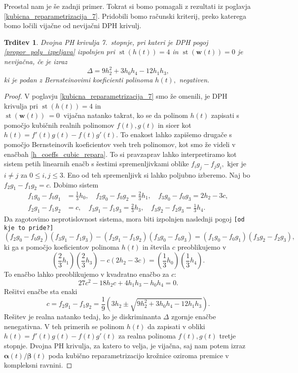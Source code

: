 \documentclass[12pt,a4paper,twoside]{article}
\theoremstyle{definition} %
\theoremstyle{plain} %
\newtheorem{trditev}[definicija]{Trditev}
\numberwithin{equation}{section}  %
\newcommand{\wV}{\mathbf{w}}
\newcommand{\balpha}{\boldsymbol \alpha}
\newcommand{\bbeta}{\boldsymbol \beta}
\DeclareMathOperator{\st}{st}
\begin{document}
Preostal nam je še zadnji primer. Tokrat si bomo pomagali z rezultati iz poglavja \ref{kubicna_reparametrizacija_7}. Pridobili bomo računski kriterij, preko katerega bomo ločili vijačne od nevijačni DPH krivulj.
\begin{trditev}
	Dvojna PH krivulja 7.\ stopnje, pri kateri je DPH pogoj \eqref{propor_poly_izpeljava} izpolnjen pri $\st(h(t))=4$ in $\st(\wV(t))=0$ je nevijačna, če je izraz
	\begin{equation}
		\label{diskriminanta}
		\Delta=9h_2^2+3h_0h_4-12h_1h_3,
	\end{equation}
	ki je podan z Bernsteinovimi koeficienti polinoma $h(t),$ negativen.
\end{trditev}
\begin{proof}
	V poglavju \ref{kubicna_reparametrizacija_7} smo že omenili, je DPH krivulja pri $\st(h(t))=4$ in \\$\st(\wV(t))~=0~$ vijačna natanko takrat, ko se da polinom $h(t)$ zapisati s pomočjo kubičnih realnih polinomov $f(t),g(t)$ in sicer kot $h(t)=f'(t)g(t)-f(t)g'(t).$ To enakost lahko zapišemo drugače s pomočjo Bernsteinovih koeficientov vseh treh polinomov, kot smo že videli v enačbah \eqref{h_coeffs_cubic_repara}. To si pravzaprav lahko interpretiramo kot sistem petih linearnih enačb s šestimi spremenljivkami oblike $f_ig_j-f_jg_i,$ kjer je $i\neq j$ za $0\leq i,j\leq 3.$ Eno od teh spremenljivk si lahko poljubno izberemo. Naj bo $f_2g_1-f_1g_2=c.$ Dobimo sistem
	\begin{align*}
		f_1g_0-f_0g_1&=\frac{1}{3}h_0,\quad f_2g_0-f_0g_2=\frac{2}{3}h_1,\quad f_3g_0-f_0g_3=2h_2-3c,\\
		f_2g_1-f_1g_2&=c,\quad f_3g_1-f_1g_3=\frac{2}{3}h_3,\quad f_3g_2-f_2g_3=\frac{1}{3}h_4.
	\end{align*}
	Da zagotovimo neprotislovnost sistema, mora biti izpolnjen naslednji pogoj \texttt{[od kje to pride?]}
	\begin{equation*}
		(f_2g_0-f_0g_2)(f_3g_1-f_1g_3)-(f_2g_1-f_1g_2)(f_3g_0-f_0g_3)=(f_1g_0-f_0g_1)(f_3g_2-f_2g_3),
	\end{equation*}
	ki ga s pomočjo koeficientov polinoma $h(t)$ in števila $c$ preoblikujemo v
	\begin{equation*}
		\left(\frac{2}{3}h_1\right)\left(\frac{2}{3}h_3\right)-c(2h_2-3c)=\left(\frac{1}{3}h_0\right)\left(\frac{1}{3}h_4\right).
	\end{equation*}
	To enačbo lahko preoblikujemo v kvadratno enačbo za $c:$
	\begin{equation*}
		27c^2-18h_2c+4h_1h_3-h_0h_4=0.
	\end{equation*}
	Rešitvi enačbe sta enaki
	\begin{equation*}
		c=f_2g_1-f_1g_2=\frac{1}{9}\left(3h_2\pm\sqrt{9h_2^2+3h_0h_4-12h_1h_3}\right).
	\end{equation*}
	Rešitev je realna natanko tedaj, ko je diskriminanta $\Delta$ zgornje enačbe nenegativna. V teh primerih se polinom $h(t)$ da zapisati v obliki $h(t)=f'(t)g(t)-f(t)g'(t)$ za realna polinoma $f(t),g(t)$ tretje stopnje. Dvojna PH krivulja, za katero to velja, je vijačna, saj nam potem izraz $\balpha(t)/\bbeta(t)$ poda kubično reparametrizacijo krožnice oziroma premice v kompleksni ravnini.
	

\end{proof}
\end{document}
